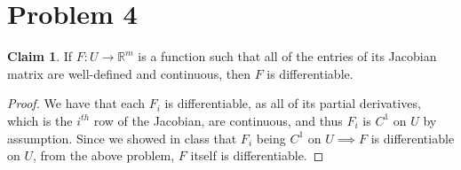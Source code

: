 \documentclass[12pt,letterpaper]{article}
\theoremstyle{definition}
\newtheorem*{claim}{Claim}
\newcommand{\R}{\mathbb{R}}
\begin{document}
\section*{Problem 4}

\begin{claim}
  If $F: U \rightarrow \R^m$ is a function such that all of the entries of its
  Jacobian matrix are well-defined and continuous, then $F$ is differentiable.
\end{claim}

\begin{proof}
  We have that each $F_i$ is differentiable, as all of its partial derivatives,
  which is the $i^{th}$ row of the Jacobian, are continuous, and thus $F_i$ is
  $C^1$ on $U$ by assumption. Since we showed in class that $F_i$ being $C^1$ on
  $U \implies F$ is differentiable on $U$, from the above problem, $F$ itself is differentiable.
\end{proof}
\end{document}
